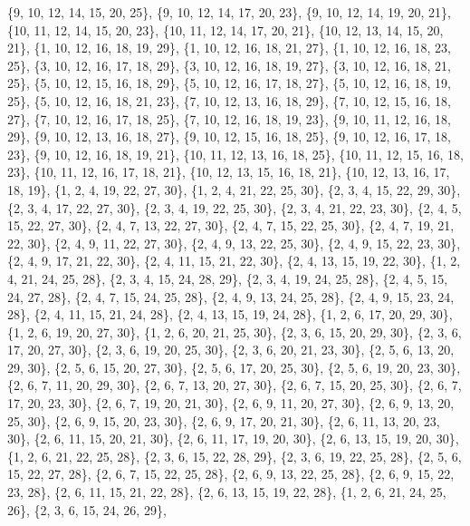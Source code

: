 \documentclass[11pt,a4paper]{article}
\begin{document}
{\{9, 10, 12, 14, 15, 20, 25\}, \{9, 10, 12, 14, 17, 20, 23\}, \{9, 10, 12, 14, 19, 20, 21\}, \{10, 11, 12, 14, 15, 20, 23\}, \{10, 11, 12, 14, 17, 20, 21\},
\{10, 12, 13, 14, 15, 20, 21\}, \{1, 10, 12, 16, 18, 19, 29\}, \{1, 10, 12, 16, 18, 21, 27\}, \{1, 10, 12, 16, 18, 23, 25\}, \{3, 10, 12, 16, 17, 18, 29\},
\{3, 10, 12, 16, 18, 19, 27\}, \{3, 10, 12, 16, 18, 21, 25\}, \{5, 10, 12, 15, 16, 18, 29\}, \{5, 10, 12, 16, 17, 18, 27\}, \{5, 10, 12, 16, 18, 19, 25\},
\{5, 10, 12, 16, 18, 21, 23\}, \{7, 10, 12, 13, 16, 18, 29\}, \{7, 10, 12, 15, 16, 18, 27\}, \{7, 10, 12, 16, 17, 18, 25\}, \{7, 10, 12, 16, 18, 19, 23\},
\{9, 10, 11, 12, 16, 18, 29\}, \{9, 10, 12, 13, 16, 18, 27\}, \{9, 10, 12, 15, 16, 18, 25\}, \{9, 10, 12, 16, 17, 18, 23\}, \{9, 10, 12, 16, 18, 19, 21\},
\{10, 11, 12, 13, 16, 18, 25\}, \{10, 11, 12, 15, 16, 18, 23\}, \{10, 11, 12, 16, 17, 18, 21\}, \{10, 12, 13, 15, 16, 18, 21\}, \{10, 12, 13, 16, 17, 18, 19\},
\{1, 2, 4, 19, 22, 27, 30\}, \{1, 2, 4, 21, 22, 25, 30\}, \{2, 3, 4, 15, 22, 29, 30\}, \{2, 3, 4, 17, 22, 27, 30\}, \{2, 3, 4, 19, 22, 25, 30\},
\{2, 3, 4, 21, 22, 23, 30\}, \{2, 4, 5, 15, 22, 27, 30\}, \{2, 4, 7, 13, 22, 27, 30\}, \{2, 4, 7, 15, 22, 25, 30\}, \{2, 4, 7, 19, 21, 22, 30\},
\{2, 4, 9, 11, 22, 27, 30\}, \{2, 4, 9, 13, 22, 25, 30\}, \{2, 4, 9, 15, 22, 23, 30\}, \{2, 4, 9, 17, 21, 22, 30\}, \{2, 4, 11, 15, 21, 22, 30\},
\{2, 4, 13, 15, 19, 22, 30\}, \{1, 2, 4, 21, 24, 25, 28\}, \{2, 3, 4, 15, 24, 28, 29\}, \{2, 3, 4, 19, 24, 25, 28\}, \{2, 4, 5, 15, 24, 27, 28\},
\{2, 4, 7, 15, 24, 25, 28\}, \{2, 4, 9, 13, 24, 25, 28\}, \{2, 4, 9, 15, 23, 24, 28\}, \{2, 4, 11, 15, 21, 24, 28\}, \{2, 4, 13, 15, 19, 24, 28\},
\{1, 2, 6, 17, 20, 29, 30\}, \{1, 2, 6, 19, 20, 27, 30\}, \{1, 2, 6, 20, 21, 25, 30\}, \{2, 3, 6, 15, 20, 29, 30\}, \{2, 3, 6, 17, 20, 27, 30\},
\{2, 3, 6, 19, 20, 25, 30\}, \{2, 3, 6, 20, 21, 23, 30\}, \{2, 5, 6, 13, 20, 29, 30\}, \{2, 5, 6, 15, 20, 27, 30\}, \{2, 5, 6, 17, 20, 25, 30\},
\{2, 5, 6, 19, 20, 23, 30\}, \{2, 6, 7, 11, 20, 29, 30\}, \{2, 6, 7, 13, 20, 27, 30\}, \{2, 6, 7, 15, 20, 25, 30\}, \{2, 6, 7, 17, 20, 23, 30\},
\{2, 6, 7, 19, 20, 21, 30\}, \{2, 6, 9, 11, 20, 27, 30\}, \{2, 6, 9, 13, 20, 25, 30\}, \{2, 6, 9, 15, 20, 23, 30\}, \{2, 6, 9, 17, 20, 21, 30\},
\{2, 6, 11, 13, 20, 23, 30\}, \{2, 6, 11, 15, 20, 21, 30\}, \{2, 6, 11, 17, 19, 20, 30\}, \{2, 6, 13, 15, 19, 20, 30\}, \{1, 2, 6, 21, 22, 25, 28\},
\{2, 3, 6, 15, 22, 28, 29\}, \{2, 3, 6, 19, 22, 25, 28\}, \{2, 5, 6, 15, 22, 27, 28\}, \{2, 6, 7, 15, 22, 25, 28\}, \{2, 6, 9, 13, 22, 25, 28\},
\{2, 6, 9, 15, 22, 23, 28\}, \{2, 6, 11, 15, 21, 22, 28\}, \{2, 6, 13, 15, 19, 22, 28\}, \{1, 2, 6, 21, 24, 25, 26\}, \{2, 3, 6, 15, 24, 26, 29\},
}
\end{document}
